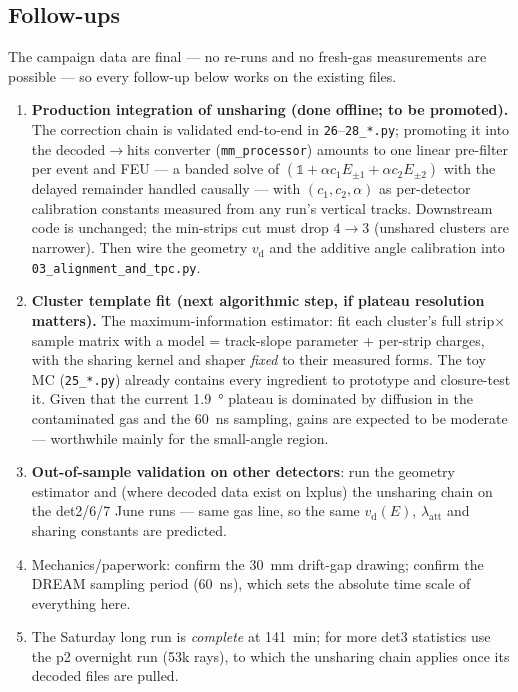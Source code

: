 \documentclass[11pt,a4paper]{article}
\newcommand{\vd}{v_{\mathrm{d}}}
\begin{document}
\subsection{Follow-ups}

The campaign data are final --- no re-runs and no fresh-gas measurements
are possible --- so every follow-up below works on the existing files.
\begin{enumerate}
  \item \textbf{Production integration of unsharing (done offline; to be
        promoted).}  The correction chain is validated end-to-end in
        \texttt{26}--\texttt{28\_*.py}; promoting it into the
        decoded$\to$hits converter (\texttt{mm\_processor}) amounts to one
        linear pre-filter per event and FEU --- a banded solve of
        $(\mathbb{1}+\alpha c_1E_{\pm1}+\alpha c_2E_{\pm2})$ with the
        delayed remainder handled causally --- with $(c_1, c_2, \alpha)$
        as per-detector calibration constants measured from any run's
        vertical tracks.  Downstream code is unchanged; the min-strips cut
        must drop $4\to3$ (unshared clusters are narrower).  Then wire the
        geometry $\vd$ and the additive angle calibration into
        \texttt{03\_alignment\_and\_tpc.py}.
  \item \textbf{Cluster template fit (next algorithmic step, if plateau
        resolution matters).}  The maximum-information estimator: fit each
        cluster's full strip$\times$sample matrix with a model =
        track-slope parameter + per-strip charges, with the sharing kernel
        and shaper \emph{fixed} to their measured forms.  The toy MC
        (\texttt{25\_*.py}) already contains every ingredient to prototype
        and closure-test it.  Given that the current \SI{1.9}{\degree}
        plateau is dominated by diffusion in the contaminated gas and the
        \SI{60}{ns} sampling, gains are expected to be moderate ---
        worthwhile mainly for the small-angle region.
  \item \textbf{Out-of-sample validation on other detectors}: run the
        geometry estimator and (where decoded data exist on lxplus) the
        unsharing chain on the det2/6/7 June runs --- same gas line, so the
        same $\vd(E)$, $\lambda_{\mathrm{att}}$ and sharing constants are
        predicted.
  \item Mechanics/paperwork: confirm the \SI{30}{mm} drift-gap drawing;
        confirm the DREAM sampling period (\SI{60}{ns}), which sets the
        absolute time scale of everything here.
  \item The Saturday long run is \emph{complete} at \SI{141}{min}; for more
        det3 statistics use the p2 overnight run (53k rays), to which the
        unsharing chain applies once its decoded files are pulled.
\end{enumerate}
\end{document}

